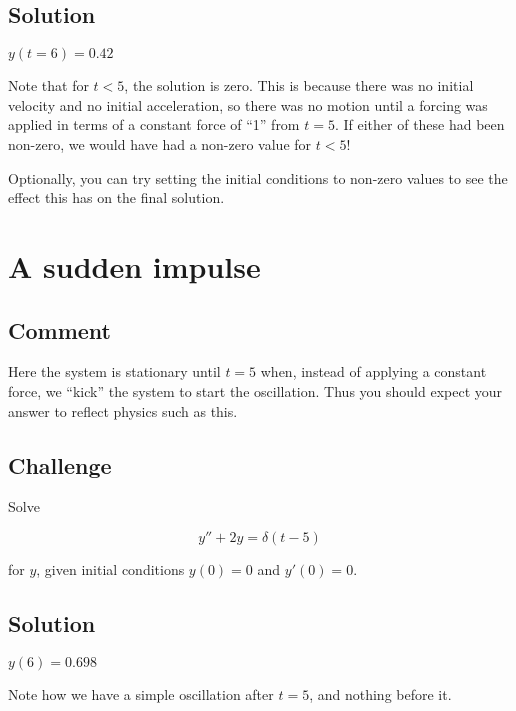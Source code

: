 \subsection*{Solution}

$y(t=6)=0.42$

Note that for $t<5$, the solution is zero. This is because there was no initial velocity and no initial acceleration, so there was no motion until a forcing was applied in terms of a constant force of ``1'' from $t=5$. If either of these had been non-zero, we would have had a non-zero value for $t<5$!

Optionally, you can try setting the initial conditions to non-zero values to see the effect this has on the final solution.




\newpage
\section{A sudden impulse}

\subsection*{Comment}
Here the system is stationary until $t=5$ when, instead of applying a constant force, we ``kick'' the system to start the oscillation. Thus you should expect your answer to reflect physics such as this.

\subsection*{Challenge}
Solve

\begin{equation}
    y''+2y=\delta(t-5)
\end{equation}

for $y$, given initial conditions $y(0)=0$ and $y'(0)=0$. 

\subsection*{Solution}

$y(6)=0.698$

Note how we have a simple oscillation after $t=5$, and nothing before it.
